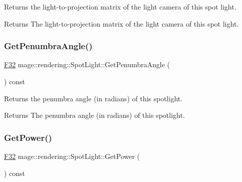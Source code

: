Returns the light-\/to-\/projection matrix of the light camera of this spot light.

\begin{DoxyReturn}{Returns}
The light-\/to-\/projection matrix of the light camera of this spot light. 
\end{DoxyReturn}
\hypertarget{classmage_1_1rendering_1_1_spot_light_a17d63e6f944d83eaca821476de70d5bc}{}\label{classmage_1_1rendering_1_1_spot_light_a17d63e6f944d83eaca821476de70d5bc} 
\subsubsection{\texorpdfstring{Get\+Penumbra\+Angle()}{GetPenumbraAngle()}}
{\footnotesize\ttfamily \hyperlink{namespacemage_aa97e833b45f06d60a0a9c4fc22ae02c0}{F32} mage\+::rendering\+::\+Spot\+Light\+::\+Get\+Penumbra\+Angle (\begin{DoxyParamCaption}{ }\end{DoxyParamCaption}) const\hspace{0.3cm}{\ttfamily [noexcept]}}

Returns the penumbra angle (in radians) of this spotlight.

\begin{DoxyReturn}{Returns}
The penumbra angle (in radians) of this spotlight. 
\end{DoxyReturn}
\hypertarget{classmage_1_1rendering_1_1_spot_light_a835e4624ec959374b099dd07c7398929}{}\label{classmage_1_1rendering_1_1_spot_light_a835e4624ec959374b099dd07c7398929} 
\subsubsection{\texorpdfstring{Get\+Power()}{GetPower()}}
{\footnotesize\ttfamily \hyperlink{namespacemage_aa97e833b45f06d60a0a9c4fc22ae02c0}{F32} mage\+::rendering\+::\+Spot\+Light\+::\+Get\+Power (\begin{DoxyParamCaption}{ }\end{DoxyParamCaption}) const\hspace{0.3cm}{\ttfamily [noexcept]}}

